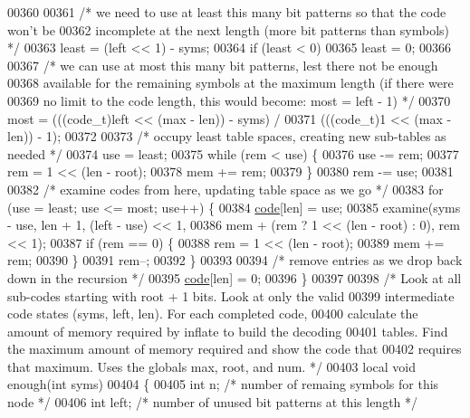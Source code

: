 \begin{DoxyCode}
{{00360 
00361     \textcolor{comment}{/* we need to use at least this many bit patterns so that the code won't be}
00362 \textcolor{comment}{       incomplete at the next length (more bit patterns than symbols) */}
00363     least = (left << 1) - syms;
00364     \textcolor{keywordflow}{if} (least < 0)
00365         least = 0;
00366 
00367     \textcolor{comment}{/* we can use at most this many bit patterns, lest there not be enough}
00368 \textcolor{comment}{       available for the remaining symbols at the maximum length (if there were}
00369 \textcolor{comment}{       no limit to the code length, this would become: most = left - 1) */}
00370     most = (((code\_t)left << (max - len)) - syms) /
00371             (((code\_t)1 << (max - len)) - 1);
00372 
00373     \textcolor{comment}{/* occupy least table spaces, creating new sub-tables as needed */}
00374     use = least;
00375     \textcolor{keywordflow}{while} (rem < use) \{
00376         use -= rem;
00377         rem = 1 << (len - root);
00378         mem += rem;
00379     \}
00380     rem -= use;
00381 
00382     \textcolor{comment}{/* examine codes from here, updating table space as we go */}
00383     \textcolor{keywordflow}{for} (use = least; use <= most; use++) \{
00384         \hyperlink{structcode}{code}[len] = use;
00385         examine(syms - use, len + 1, (left - use) << 1,
00386                 mem + (rem ? 1 << (len - root) : 0), rem << 1);
00387         \textcolor{keywordflow}{if} (rem == 0) \{
00388             rem = 1 << (len - root);
00389             mem += rem;
00390         \}
00391         rem--;
00392     \}
00393 
00394     \textcolor{comment}{/* remove entries as we drop back down in the recursion */}
00395     \hyperlink{structcode}{code}[len] = 0;
00396 \}
00397 
00398 \textcolor{comment}{/* Look at all sub-codes starting with root + 1 bits.  Look at only the valid}
00399 \textcolor{comment}{   intermediate code states (syms, left, len).  For each completed code,}
00400 \textcolor{comment}{   calculate the amount of memory required by inflate to build the decoding}
00401 \textcolor{comment}{   tables. Find the maximum amount of memory required and show the code that}
00402 \textcolor{comment}{   requires that maximum.  Uses the globals max, root, and num. */}
00403 local \textcolor{keywordtype}{void} enough(\textcolor{keywordtype}{int} syms)
00404 \{
00405     \textcolor{keywordtype}{int} n;              \textcolor{comment}{/* number of remaing symbols for this node */}
00406     \textcolor{keywordtype}{int} left;           \textcolor{comment}{/* number of unused bit patterns at this length */}
}}
\end{DoxyCode}
